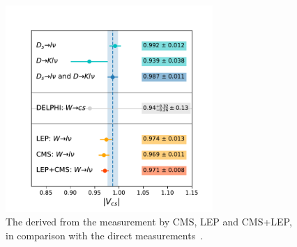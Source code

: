  \begin{figure}[!h]
    \centering
    \includegraphics[width=0.7\textwidth]{chapters/Introduction/sectionRelatedWorks/figures/vcs.pdf}
    \caption{The \absVcs derived from the \BWl measurement by CMS, LEP and CMS+LEP, in comparison with the direct measurements~\cite{pdg2020}.}
    \label{fig:analysis:result:vcs}
\end{figure}















